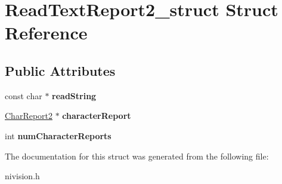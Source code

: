 \hypertarget{structReadTextReport2__struct}{
\section{ReadTextReport2\_\-struct Struct Reference}
\label{structReadTextReport2__struct}
}
\subsection*{Public Attributes}
\begin{DoxyCompactItemize}
\item 
\hypertarget{structReadTextReport2__struct_ad96b2d2abe2e6bbe84aabba46f136c71}{
const char $\ast$ {\bfseries readString}}
\label{structReadTextReport2__struct_ad96b2d2abe2e6bbe84aabba46f136c71}

\item 
\hypertarget{structReadTextReport2__struct_af4076e01608522851c0215d2d4373221}{
\hyperlink{structCharReport2__struct}{CharReport2} $\ast$ {\bfseries characterReport}}
\label{structReadTextReport2__struct_af4076e01608522851c0215d2d4373221}

\item 
\hypertarget{structReadTextReport2__struct_ac5c5ff5bc27c0a66f6bfc3a73eff10d9}{
int {\bfseries numCharacterReports}}
\label{structReadTextReport2__struct_ac5c5ff5bc27c0a66f6bfc3a73eff10d9}

\end{DoxyCompactItemize}


The documentation for this struct was generated from the following file:\begin{DoxyCompactItemize}
\item 
nivision.h\end{DoxyCompactItemize}
